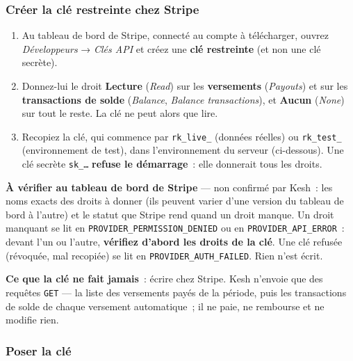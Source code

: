 \documentclass[a4paper,11pt,oneside]{article}
\begin{document}
\subsubsection{Créer la clé restreinte chez Stripe}

\begin{enumerate}
    \item Au tableau de bord de Stripe, connecté au compte à télécharger, ouvrez \emph{Développeurs} → \emph{Clés API} et créez une \textbf{clé restreinte} (et non une clé secrète).
    \item Donnez-lui le droit \textbf{Lecture} (\emph{Read}) sur les \textbf{versements} (\emph{Payouts}) et sur les \textbf{transactions de solde} (\emph{Balance}, \emph{Balance transactions}), et \textbf{Aucun} (\emph{None}) sur tout le reste. La clé ne peut alors que lire.
    \item Recopiez la clé, qui commence par \texttt{rk\_live\_} (données réelles) ou \texttt{rk\_test\_} (environnement de test), dans l'environnement du serveur (ci-dessous). Une clé secrète \texttt{sk\_…} \textbf{refuse le démarrage}~: elle donnerait tous les droits.
\end{enumerate}

\begin{keshwarning}
\textbf{À vérifier au tableau de bord de Stripe} --- non confirmé par Kesh~: les noms exacts des droits à donner (ils peuvent varier d'une version du tableau de bord à l'autre) et le statut que Stripe rend quand un droit manque. Un droit manquant se lit en \texttt{PROVIDER\_PERMISSION\_DENIED} ou en \texttt{PROVIDER\_API\_ERROR}~: devant l'un ou l'autre, \textbf{vérifiez d'abord les droits de la clé}. Une clé refusée (révoquée, mal recopiée) se lit en \texttt{PROVIDER\_AUTH\_FAILED}. Rien n'est écrit.
\end{keshwarning}

\textbf{Ce que la clé ne fait jamais}~: écrire chez Stripe. Kesh n'envoie que des requêtes \texttt{GET} --- la liste des versements payés de la période, puis les transactions de solde de chaque versement automatique~; il ne paie, ne rembourse et ne modifie rien.

\subsubsection{Poser la clé}
\end{document}

